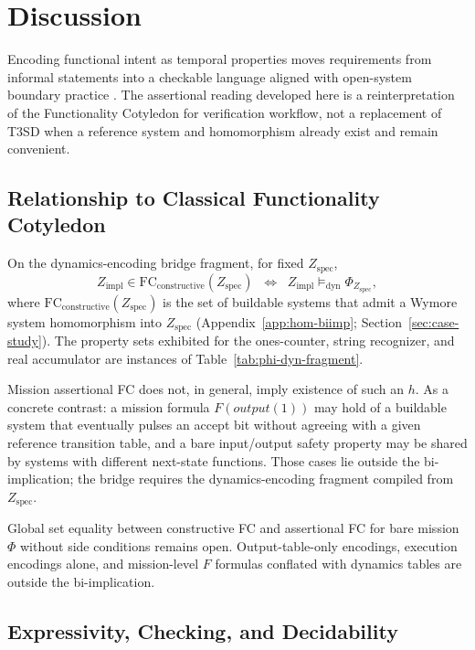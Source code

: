 \section{Discussion} \label{sec:discussion}

Encoding functional intent as temporal properties moves requirements from informal statements into a checkable language aligned with open-system boundary practice \citep{salado2019mbse,BaierKatoen2008}. The assertional reading developed here is a reinterpretation of the Functionality Cotyledon for verification workflow, not a replacement of T3SD when a reference system and homomorphism already exist and remain convenient.

\subsection{Relationship to Classical Functionality Cotyledon}
\label{sec:classical-fc}

On the dynamics-encoding bridge fragment, for fixed $Z_{\text{spec}}$,
\[
  Z_{\text{impl}} \in \mathrm{FC}_{\text{constructive}}(Z_{\text{spec}})
  \;\;\Longleftrightarrow\;\;
  Z_{\text{impl}} \models_{\mathrm{dyn}} \Phi_{Z_{\text{spec}}},
\]
where $\mathrm{FC}_{\text{constructive}}(Z_{\text{spec}})$ is the set of buildable systems that admit a Wymore system homomorphism into $Z_{\text{spec}}$ (Appendix~\ref{app:hom-biimp}; Section~\ref{sec:case-study}). The property sets exhibited for the ones-counter, string recognizer, and real accumulator are instances of Table~\ref{tab:phi-dyn-fragment}.

Mission assertional FC does not, in general, imply existence of such an $h$. As a concrete contrast: a mission formula $F(\mathit{output}(1))$ may hold of a buildable system that eventually pulses an accept bit without agreeing with a given reference transition table, and a bare input/output safety property may be shared by systems with different next-state functions. Those cases lie outside the bi-implication; the bridge requires the dynamics-encoding fragment compiled from $Z_{\text{spec}}$.

Global set equality between constructive FC and assertional FC for bare mission $\Phi$ without side conditions remains open. Output-table-only encodings, execution encodings alone, and mission-level $F$ formulas conflated with dynamics tables are outside the bi-implication.

\subsection{Expressivity, Checking, and Decidability}
\label{sec:expressivity}
\label{sec:limitations}

